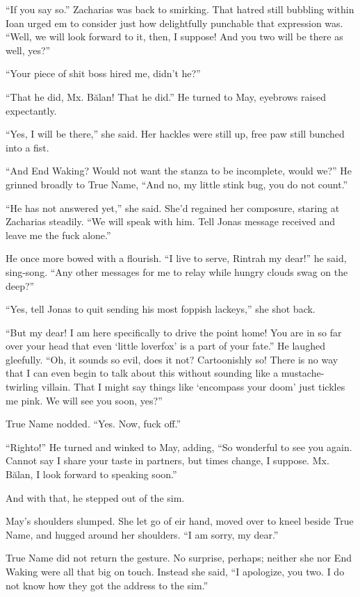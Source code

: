 ``If you say so.'' Zacharias was back to smirking. That hatred still bubbling within Ioan urged em to consider just how delightfully punchable that expression was. ``Well, we will look forward to it, then, I suppose! And you two will be there as well, yes?''

``Your piece of shit boss hired me, didn't he?''

``That he did, Mx. Bălan! That he did.'' He turned to May, eyebrows raised expectantly.

``Yes, I will be there,'' she said. Her hackles were still up, free paw still bunched into a fist.

``And End Waking? Would not want the stanza to be incomplete, would we?'' He grinned broadly to True Name, ``And no, my little stink bug, you do not count.''

``He has not answered yet,'' she said. She'd regained her composure, staring at Zacharias steadily. ``We will speak with him. Tell Jonas message received and leave me the fuck alone.''

He once more bowed with a flourish. ``I live to serve, Rintrah my dear!'' he said, sing-song. ``Any other messages for me to relay while hungry clouds swag on the deep?''

``Yes, tell Jonas to quit sending his most foppish lackeys,'' she shot back.

``But my dear! I am here specifically to drive the point home! You are in so far over your head that even `little loverfox' is a part of your fate.'' He laughed gleefully. ``Oh, it sounds so evil, does it not? Cartoonishly so! There is no way that I can even begin to talk about this without sounding like a mustache-twirling villain. That I might say things like `encompass your doom' just tickles me pink. We will see you soon, yes?''

True Name nodded. ``Yes. Now, fuck off.''

``Righto!'' He turned and winked to May, adding, ``So wonderful to see you again. Cannot say I share your taste in partners, but times change, I suppose. Mx. Bălan, I look forward to speaking soon.''

And with that, he stepped out of the sim.

May's shoulders slumped. She let go of eir hand, moved over to kneel beside True Name, and hugged around her shoulders. ``I am sorry, my dear.''

True Name did not return the gesture. No surprise, perhaps; neither she nor End Waking were all that big on touch. Instead she said, ``I apologize, you two. I do not know how they got the address to the sim.''

